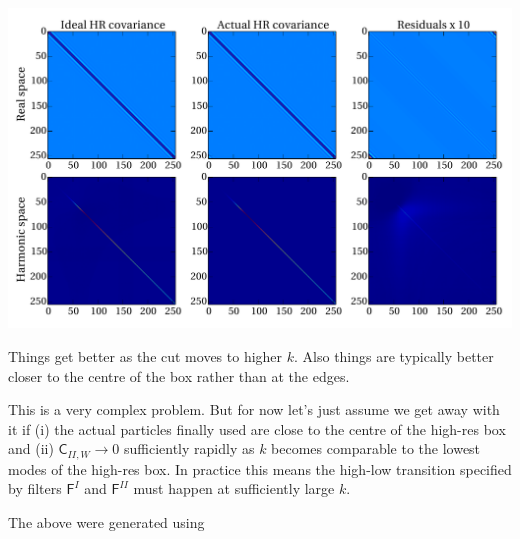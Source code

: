 \documentclass[11pt,a4paper,preprint]{aastex}
\begin{document}
\includegraphics[width=\textwidth]{figs/zoom_test3.pdf}

Things get better as the cut moves to higher $k$. Also things are
typically better closer to the centre of the box rather than at the
edges. 

This is a very complex problem. But for now let's just assume we get
away with it if (i) the actual particles finally used are close to the
centre of the high-res box and (ii) $\mathsf{C}_{II,W} \to 0$
sufficiently rapidly as $k$ becomes comparable to the lowest modes of
the high-res box. In practice this means the high-low transition
specified by filters $\mathsf{F}^I$ and $\mathsf{F}^{II}$ must happen
at sufficiently large $k$.

The above were generated using 
\end{document}
